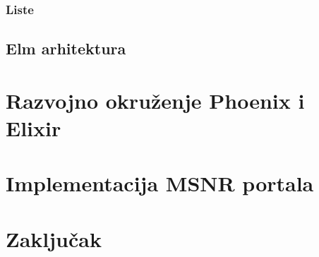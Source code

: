 \documentclass[12pt,oneside]{memoir}
\begin{document}
\subsection{Liste} 



\section{Elm arhitektura}
\chapter{Razvojno okruženje Phoenix i Elixir}

\chapter{Implementacija MSNR portala}

\chapter{Zaključak}


\literatura

\end{document}
